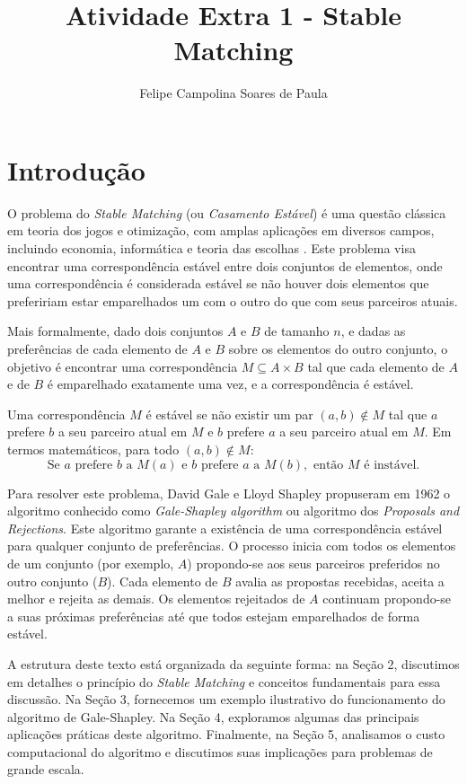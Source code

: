 \documentclass[12pt]{article}
\title{Atividade Extra 1 - Stable Matching}
\author{Felipe Campolina Soares de Paula\inst{1}}
\begin{document}
 

\maketitle
\section{Introdução}

O problema do \textit{Stable Matching} (ou \textit{Casamento Estável}) é uma questão clássica em teoria dos jogos e otimização, com amplas aplicações em diversos campos, incluindo economia, informática e teoria das escolhas \cite{gale:62}. Este problema visa encontrar uma correspondência estável entre dois conjuntos de elementos, onde uma correspondência é considerada estável se não houver dois elementos que prefeririam estar emparelhados um com o outro do que com seus parceiros atuais.

Mais formalmente, dado dois conjuntos \( A \) e \( B \) de tamanho \( n \), e dadas as preferências de cada elemento de \( A \) e \( B \) sobre os elementos do outro conjunto, o objetivo é encontrar uma correspondência \( M \subseteq A \times B \) tal que cada elemento de \( A \) e de \( B \) é emparelhado exatamente uma vez, e a correspondência é estável. 

Uma correspondência \( M \) é estável se não existir um par \((a, b) \notin M\) tal que \( a \) prefere \( b \) a seu parceiro atual em \( M \) e \( b \) prefere \( a \) a seu parceiro atual em \( M \). Em termos matemáticos, para todo \( (a, b) \notin M \):
\[
\text{Se } a \text{ prefere } b \text{ a } M(a) \text{ e } b \text{ prefere } a \text{ a } M(b), \text{ então } M \text{ é instável}.
\]

Para resolver este problema, David Gale e Lloyd Shapley propuseram em 1962 o algoritmo conhecido como \textit{Gale-Shapley algorithm} ou algoritmo dos \textit{Proposals and Rejections}. Este algoritmo garante a existência de uma correspondência estável para qualquer conjunto de preferências. O processo inicia com todos os elementos de um conjunto (por exemplo, \( A \)) propondo-se aos seus parceiros preferidos no outro conjunto (\( B \)). Cada elemento de \( B \) avalia as propostas recebidas, aceita a melhor e rejeita as demais. Os elementos rejeitados de \( A \) continuam propondo-se a suas próximas preferências até que todos estejam emparelhados de forma estável.

A estrutura deste texto está organizada da seguinte forma: na Seção 2, discutimos em detalhes o princípio do \textit{Stable Matching} e conceitos fundamentais para essa discussão. Na Seção 3, fornecemos um exemplo ilustrativo do funcionamento do algoritmo de Gale-Shapley. Na Seção 4, exploramos algumas das principais aplicações práticas deste algoritmo. Finalmente, na Seção 5, analisamos o custo computacional do algoritmo e discutimos suas implicações para problemas de grande escala.
\end{document}
